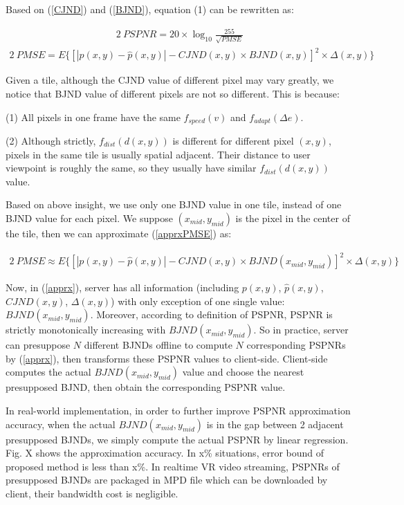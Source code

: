 Based on (\ref{CJND}) and (\ref{BJND}), equation (1) can be rewritten as:

\begin{alignat}{2}\
\label{f1} PSPNR = 20 \times \log_{10}\frac{255}{\sqrt{PMSE}}
\end{alignat}
\begin{alignat}{2}\
PMSE=E\{ \left[ |p(x, y) - \hat{p}(x, y)| - CJND(x, y) \times BJND(x, y)\right]^2 \times \Delta (x, y)\} \label{apprxPMSE}
\end{alignat} 

Given a tile, although the CJND value of different pixel may vary greatly, we notice that BJND value of different pixels are not so different. This is because:

 (1) All pixels in one frame have the same $f_{speed}(v)$ and $f_{adapt}(\Delta e)$. 
 
 (2) Although strictly, $f_{dist}(d(x, y))$ is different for different pixel $(x, y)$, pixels in the same tile is usually spatial adjacent. Their distance to user viewpoint is roughly the same, so they usually have similar $f_{dist}(d(x, y))$ value.

Based on above insight, we use only one BJND value in one tile, instead of one BJND value for each pixel. We suppose $(x_{mid}, y_{mid})$ is the pixel in the center of the tile, then we can approximate (\ref{apprxPMSE}) as:

\begin{alignat}{2}\
PMSE \approx E\{ \left[ |p(x, y) - \hat{p}(x, y)| - CJND(x, y) \times BJND(x_{mid}, y_{mid})\right]^2 \times \Delta (x, y)\} \label{apprx}
\end{alignat} 

Now, in (\ref{apprx}), server has all information (including $p(x, y)$, $\hat{p}(x, y)$, $CJND(x, y)$, $\Delta (x, y)$) with only exception of one single value: $BJND(x_{mid}, y_{mid})$. Moreover, according to definition of PSPNR, PSPNR is strictly monotonically increasing with $BJND(x_{mid}, y_{mid})$. So in practice, server can presuppose $N$ different BJNDs offline to compute $N$ corresponding PSPNRs by (\ref{apprx}), then transforms these PSPNR values to client-side. Client-side computes the actual $BJND(x_{mid}, y_{mid})$ value and choose the nearest presupposed BJND, then obtain the corresponding PSPNR value.

In real-world implementation, in order to further improve PSPNR approximation accuracy, when the actual $BJND(x_{mid}, y_{mid})$ is in the gap between 2 adjacent presupposed BJNDs, we simply compute the actual PSPNR by linear regression. Fig. X shows the approximation accuracy. In x\% situations, error bound of proposed method is less than x\%. In realtime VR video streaming, PSPNRs of presupposed BJNDs are packaged in MPD file which can be downloaded by client, their bandwidth cost is negligible.

